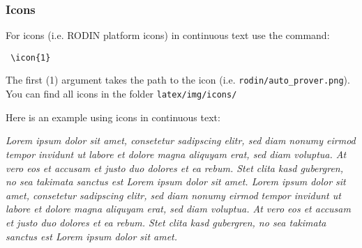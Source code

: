 \subsubsection{Icons}

For icons (i.e. RODIN platform icons) in continuous text use the command: 

\begin{verbatim} \icon{1} \end{verbatim} 

The first (1) argument takes the path to the icon (i.e. \texttt{rodin/auto\_prover.png}). You can find all icons in the folder \texttt{latex/img/icons/}

Here is an example using icons in continuous text:

\textit{Lorem ipsum dolor sit amet, consetetur  sadipscing elitr, sed diam nonumy eirmod tempor invidunt ut labore et dolore magna aliquyam erat, sed diam voluptua. At vero eos et accusam et justo duo dolores et ea rebum. Stet clita kasd gubergren, no sea takimata sanctus est Lorem ipsum dolor sit amet. Lorem ipsum dolor sit amet, consetetur sadipscing elitr, sed diam nonumy eirmod tempor invidunt ut labore et dolore  magna aliquyam erat, sed diam voluptua. At vero eos et accusam et justo duo dolores et ea rebum. Stet clita kasd gubergren, no sea takimata sanctus est Lorem ipsum dolor sit amet.}

